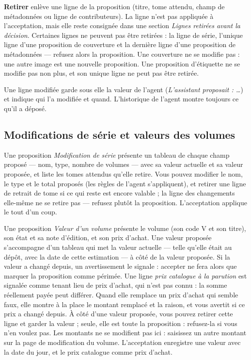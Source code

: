 \textbf{Retirer} enlève une ligne de la proposition (titre, tome
attendu, champ de métadonnées ou ligne de contributeurs). La ligne
n'est pas appliquée à l'acceptation, mais elle reste consignée dans
une section \emph{Lignes retirées avant la décision}. Certaines lignes
ne peuvent pas être retirées : la ligne de série, l'unique ligne d'une
proposition de couverture et la dernière ligne d'une proposition de
métadonnées --- refusez alors la proposition. Une couverture ne se
modifie pas : une autre image est une nouvelle proposition. Une
proposition d'étiquette ne se modifie pas non plus, et son unique ligne
ne peut pas être retirée.

Une ligne modifiée garde sous elle la valeur de l'agent
(\emph{L'assistant proposait : \dots}) et indique qui l'a modifiée et
quand. L'historique de l'agent montre toujours ce qu'il a déposé.

\subsection{Modifications de série et valeurs des volumes}
\label{sec:proposals-series-value}

Une proposition \emph{Modification de série} présente un tableau de
chaque champ proposé --- nom, type, nombre de volumes --- avec sa valeur
actuelle et sa valeur proposée, et liste les tomes attendus qu'elle
retire. Vous pouvez modifier le nom, le type et le total proposés (les
règles de l'agent s'appliquent), et retirer une ligne de retrait de tome
si ce qui reste est encore valable ; la ligne des changements elle-même
ne se retire pas --- refusez plutôt la proposition. L'acceptation
applique le tout d'un coup.

Une proposition \emph{Valeur d'un volume} présente le volume (son code V
et son titre), son état et sa note d'édition, et son prix d'achat. Une
valeur proposée s'accompagne d'un tableau qui met la valeur actuelle ---
telle qu'elle était au dépôt, avec la date de cette estimation --- à côté
de la valeur proposée. Si la valeur a changé depuis, un avertissement le
signale : accepter ne fera alors que marquer la proposition comme
périmée. Une ligne \emph{prix catalogue à la parution} est signalée
comme tenant lieu de prix d'achat, qui n'est pas connu : la somme
réellement payée peut différer. Quand elle remplace un prix d'achat qui
semble faux, elle montre à la place le montant remplacé et la raison, et
vous avertit si ce prix a changé depuis. À côté d'une valeur proposée,
vous pouvez retirer cette ligne et garder la valeur ; seule, elle est
toute la proposition : refusez-la si vous n'en voulez pas. Les montants
ne se modifient pas ici : saisissez un autre montant sur la page de
modification du volume. L'acceptation enregistre une valeur avec la date
du jour, et le prix catalogue comme prix d'achat.

